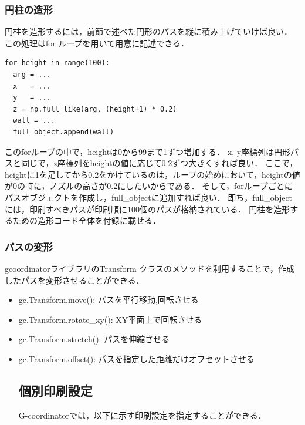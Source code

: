\documentclass{article}
\begin{document}
\begin{twocolumn}
\subsubsection{円柱の造形}
円柱を造形するには，前節で述べた円形のパスを縦に積み上げていけば良い．
この処理はfor ループを用いて用意に記述できる．
\begin{lstlisting}[breaklines=false]
for height in range(100):
  arg = ...
  x   = ...
  y   = ...
  z = np.full_like(arg, (height+1) * 0.2)
  wall = ...
  full_object.append(wall)
\end{lstlisting}
このforループの中で，heightは0から99まで1ずつ増加する．
x, y座標列は円形パスと同じで，z座標列をheightの値に応じて0.2ずつ大きくすれば良い．
ここで，heightに1を足してから0.2をかけているのは，ループの始めにおいて，heightの値が0の時に，ノズルの高さが0.2にしたいからである．
そして，forループごとにパスオブジェクトを作成し，full\_objectに追加すれば良い．
即ち，full\_objectには，印刷すべきパスが印刷順に100個のパスが格納されている．
円柱を造形するための造形コード全体を付録に載せる．

\subsubsection{パスの変形}
gcoordinatorライブラリのTransform クラスのメソッドを利用することで，作成したパスを変形させることができる．
\begin{itemize}
  \item gc.Transform.move(): パスを平行移動,回転させる
  \item gc.Transform.rotate\_xy(): XY平面上で回転させる
  \item gc.Transform.stretch(): パスを伸縮させる
  \item gc.Transform.offset():  パスを指定した距離だけオフセットさせる

\subsection{個別印刷設定} 
G-coordinatorでは，以下に示す印刷設定を指定することができる．


\end{itemize}
\end{twocolumn}
\end{document}
